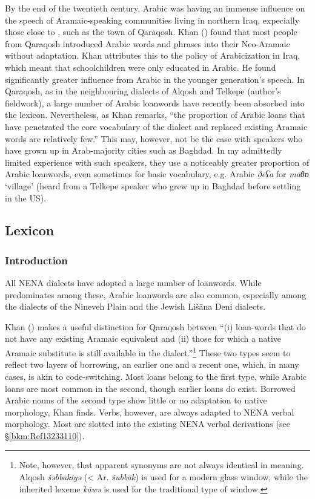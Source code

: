 \documentclass[output=paper]{langsci/langscibook}
\begin{document}
By the end of the twentieth century, Arabic was having an immense influence on the speech of  Aramaic-speaking communities living in northern Iraq, expecially those close to , such as the town of Qaraqosh. Khan (\citeyear[9]{Khan2002}) found that most people from Qaraqosh introduced Arabic words and phrases into their Neo-Aramaic without adaptation.  Khan attributes this to the policy of Arabicization in Iraq, which meant that schoolchildren were only educated in Arabic. He found significantly greater influence from Arabic in the younger generation’s speech. In  Qaraqosh, as in the neighbouring dialects of  Alqosh and  Telkepe (author’s fieldwork), a large number of Arabic {loanwords} have recently been absorbed into the lexicon. Nevertheless, as Khan remarks, “the proportion of Arabic loans that have penetrated the {core vocabulary} of the dialect and replaced existing Aramaic words are relatively few.” This may, however, not be the case with speakers who have grown up in Arab-majority cities such as Baghdad. In my admittedly limited experience with such speakers, they use a noticeably greater proportion of Arabic {loanwords}, even sometimes for basic vocabulary, e.g.  Arabic \textit{ð̣ēʕa} for \textit{māθɒ} ‘village’ (heard from a  Telkepe speaker who grew up in Baghdad before settling in the US).

\subsection{Lexicon}
\subsubsection{\label{bkm:Ref13232790}Introduction}

All NENA dialects have adopted a large number of {loanwords}. While  predominates among these, Arabic {loanwords} are also common, especially among the  dialects of the Nineveh Plain and the Jewish Lišāna Deni dialects.

 Khan (\citeyear[516]{Khan2002}) makes a useful distinction for  Qaraqosh between “(i) loan-words that do not have any existing Aramaic equivalent and (ii) those for which a native Aramaic substitute is still available in the dialect.”\footnote{Note, however, that apparent synonyms are not always identical in meaning.  Alqosh \textit{šəbbakiyə} (< Ar. \textit{šubbāk}) is used for a modern glass window, while the inherited lexeme \textit{kāwə} is used for the traditional type of window.} These two types seem to reflect two layers of borrowing, an earlier one and a recent one, which, in many cases, is akin to {code-switching}. Most  loans belong to the first type, while Arabic loans are most common in the second, though earlier loans do exist. Borrowed Arabic nouns of the second type show little or no adaptation to native morphology, Khan finds. Verbs, however, are always adapted to NENA verbal morphology. Most are slotted into the existing NENA verbal derivations (see §\ref{bkm:Ref13233110}).
\end{document}
